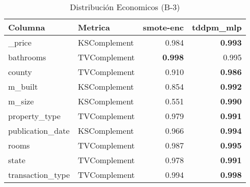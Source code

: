 \begin{table}[H]
\centering
\caption{Distribución Economicos (B-3)}
\label{table-shape-economicos-b-3}
\begin{tabular}{|l|l|r|r|}
\hline
\rowcolor[gray]{0.8}
Columna & Metrica & smote-enc & tddpm\_mlp \\
\hline \_price & KSComplement & 0.984 & \bfseries 0.993 \\
\hline bathrooms & TVComplement & \bfseries 0.998 & 0.995 \\
\hline county & TVComplement & 0.910 & \bfseries 0.986 \\
\hline m\_built & KSComplement & 0.854 & \bfseries 0.992 \\
\hline m\_size & KSComplement & 0.551 & \bfseries 0.990 \\
\hline property\_type & TVComplement & 0.979 & \bfseries 0.991 \\
\hline publication\_date & KSComplement & 0.966 & \bfseries 0.994 \\
\hline rooms & TVComplement & 0.987 & \bfseries 0.995 \\
\hline state & TVComplement & 0.978 & \bfseries 0.991 \\
\hline transaction\_type & TVComplement & 0.994 & \bfseries 0.998 \\
\hline
\end{tabular}
\end{table}
